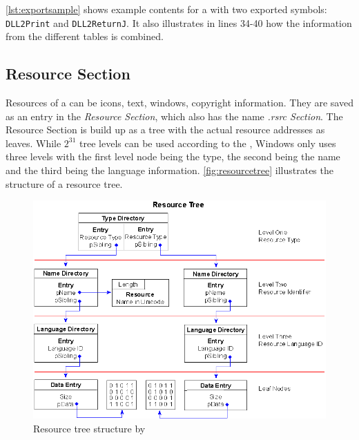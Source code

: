 \autoref{lst:exportsample} shows example contents for a \DLL{} with two exported symbols: \texttt{DLL2Print} and \texttt{DLL2ReturnJ}. It also illustrates in lines 34-40  how the information from the different tables is combined. 



\subsection*{Resource Section}

Resources of a \PE{} can be \ia{} icons, text, windows, copyright information. They are saved as an entry in the \emph{Resource Section}, which also has the name \emph{.rsrc Section}. The Resource Section is build up as a tree with the actual resource addresses as leaves. While \(2^{31}\) tree levels can be used according to the \PECOFF{} \cite[]{pespec}, Windows only uses three levels with the first level node being the type, the second being the name and the third being the language information. \autoref{fig:resourcetree} illustrates the structure of a resource tree.

\begin{figure}
\includegraphics[width=.98\textwidth, height=\textheight,keepaspectratio]{graphics/resourcetree}
\caption{ Resource tree structure by }
\label{fig:resourcetree} 
\end{figure}

